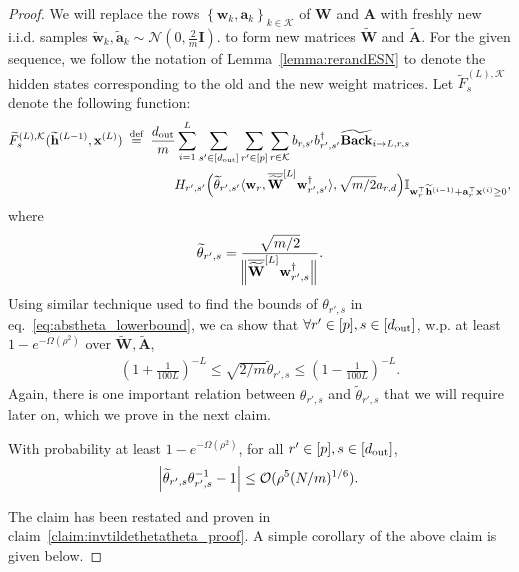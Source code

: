 \begin{proof}
We will replace the rows $\left\{\mathbf{w}_{k}, \mathbf{a}_{k}\right\}_{k \in \mathcal{K}}$ of $\mathbf{W}$ and $\mathbf{A}$ with freshly new i.i.d. samples $\widetilde{\mathbf{w}}_{k}, \widetilde{\mathbf{a}}_{k} \sim \mathcal{N}\left(0, \frac{2}{m} \mathbf{I}\right).$ to form new matrices $\widetilde{\mathbf{W}}$ and $\widetilde{\mathbf{A}}$. For the given sequence, we follow the notation of Lemma~\ref{lemma:rerandESN} to denote the hidden states corresponding to the old and the new weight matrices. Let $\widetilde{F}^{(L), \mathcal{K}}_s$ denote the following function:
\begin{align*}
	\widetilde{F}_{s}^{(L), \mathcal{K}}(\widetilde{\mathbf{h}}^{(L-1)}, \mathbf{x}^{(L)}) &\stackrel{\text { def }}{=} \frac{d_{\mathrm{out}} }{m} \sum_{i=1}^{L}  \sum_{s' \in [d_{\mathrm{out}} ]} \sum_{r' \in [p]} \sum_{r \in \mathcal{K}}  b_{r, s'} b_{r', s'}^{\dagger} \widetilde{\mathbf{Back}}_{i \to L, r, s} \nonumber\\& \quad \quad \quad \quad H_{r', s'}\Big(\widetilde{\theta}_{r', s'} \langle \mathbf{w}_{r}, \overline{\widetilde{\mathbf{W}}}^{[L]} \mathbf{w}_{r', s'}^{\dagger}\rangle , \sqrt{m/2} a_{r, d}\Big) \mathbb{I}_{\mathbf{w}_r^{\top} \widetilde{\mathbf{h}}^{(i-1)} + \mathbf{a}_r^{\top} \mathbf{x}^{(i)} \ge 0}, 
\end{align*}
where
\begin{equation*} 
	\widetilde{\theta}_{r', s} = \frac{\sqrt{m/2}}{ \norm[2]{\overline{\widetilde{\mathbf{W}}}^{[L]} \mathbf{w}_{r', s}^{\dagger}}}.
\end{equation*}
Using similar technique used to find the bounds of $\theta_{r', s}$ in eq.~\ref{eq:abstheta_lowerbound}, we ca show that $\forall  r' \in [p], s \in [d_{\mathrm{out}} ]$, w.p. at least $1-e^{-\Omega(\rho^2)}$ over $\widetilde{\mathbf{W}}, \widetilde{\mathbf{A}}$,
\begin{align}
	\left(1 + \frac{1}{100L}\right)^{-L}  \le \sqrt{2/m} \widetilde{\theta}_{r', s} \le  \left(1 - \frac{1}{100L}\right)^{-L}  \label{eq:abstildetheta_lowerbound}.
\end{align}
Again, there is one important relation between $\theta_{r', s}$  and $\widetilde{\theta}_{r', s}$ that we will require later on, which we prove in the next claim.
\begin{claim}\label{claim:invtildethetatheta}
	With probability at least $1-e^{-\Omega(\rho^2)}$, for all $r' \in [p], s \in [d_{\mathrm{out}} ]$,
	\begin{align*}
		\abs{\widetilde{\theta}_{r', s} \theta_{r', s}^{-1} - 1} \le \mathcal{O}(\rho^5 (N/m)^{1/6}).
	\end{align*}
\end{claim}
The claim has been restated and proven in claim~\ref{claim:invtildethetatheta_proof}. A simple corollary of the above claim is given below.



\end{proof}
